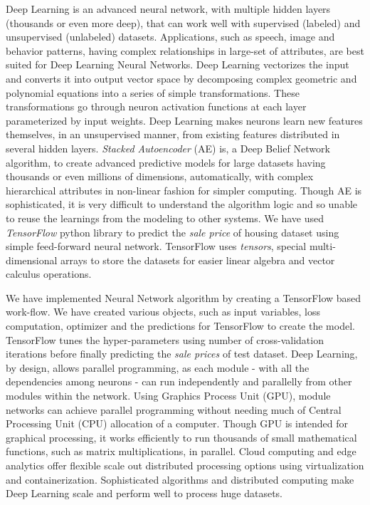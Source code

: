\documentclass[sigconf]{acmart}
\begin{document}
	Deep Learning is an advanced neural network, with multiple hidden layers (thousands or even more deep), that can work well with supervised (labeled) and unsupervised (unlabeled) datasets. Applications, such as speech, image and behavior patterns, having complex relationships in large-set of attributes, are best suited for Deep Learning Neural Networks. Deep Learning vectorizes the input and converts it into output vector space by decomposing complex geometric and polynomial equations into a series of simple transformations. These transformations go through neuron activation functions at each layer parameterized by input weights. Deep Learning makes neurons learn new features themselves, in an unsupervised manner, from existing features distributed in several hidden layers. {\em Stacked Autoencoder} (AE) is, a Deep Belief Network algorithm, to create advanced predictive models for large datasets having thousands or even millions of dimensions, automatically, with complex hierarchical attributes in non-linear fashion for simpler computing. Though AE is sophisticated, it is very difficult to understand the algorithm logic and so unable to reuse the learnings from the modeling to other systems. We have used {\em TensorFlow} python library to predict the {\em sale price} of housing dataset using simple feed-forward neural network. TensorFlow uses {\em tensors}, special multi-dimensional arrays to store the datasets for easier linear algebra and vector calculus operations.
	
	We have implemented Neural Network algorithm by creating a TensorFlow based work-flow. We have created various objects, such as input variables, loss computation, optimizer and the predictions for TensorFlow to create the model. TensorFlow tunes the hyper-parameters using number of cross-validation iterations before finally predicting the {\em sale prices} of test dataset. Deep Learning, by design, allows parallel programming, as each module - with all the dependencies among neurons - can run independently and parallelly from other modules within the network. Using Graphics Process Unit (GPU), module networks can achieve parallel programming without needing much of Central Processing Unit (CPU) allocation of a computer. Though GPU is intended for graphical processing, it works efficiently to run thousands of small mathematical functions, such as matrix multiplications, in parallel. Cloud computing and edge analytics offer flexible scale out distributed processing options using virtualization and containerization. Sophisticated algorithms and distributed computing make Deep Learning scale and perform well to process huge datasets. 
	
\end{document}
